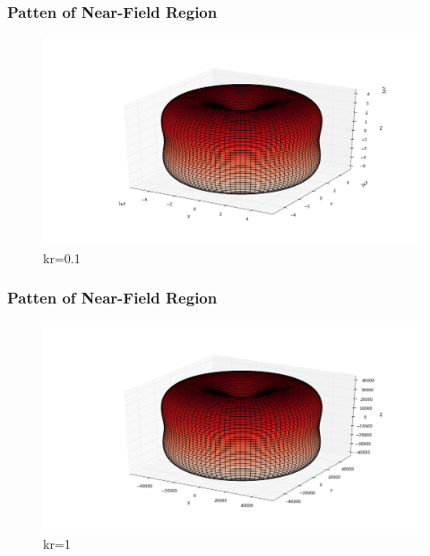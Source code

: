 \documentclass[compress=true]{beamer}
\begin{document}
\begin{frame}
  \frametitle{Patten of Near-Field Region}
  \begin{figure}
    \includegraphics[height=0.7\textheight]{near_kr_0_1_1.png}
    \caption*{\tiny{kr=0.1}}
  \end{figure}
\end{frame}
\begin{frame}
  \frametitle{Patten of Near-Field Region}
  \begin{figure}
    \includegraphics[height=0.7\textheight]{near_kr_1_1.png}
    \caption*{\tiny{kr=1}}
  \end{figure}
\end{frame}
\end{document}

